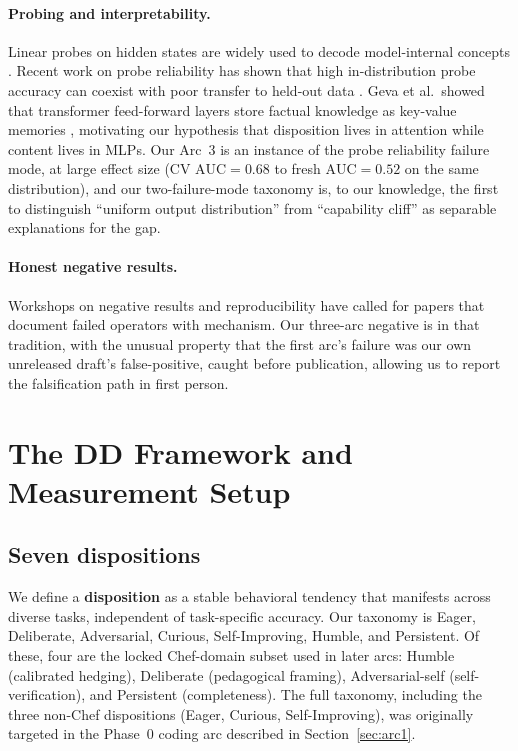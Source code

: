 \documentclass[11pt,a4paper]{article}
\begin{document}
\paragraph{Probing and interpretability.} Linear probes on hidden states are widely used to decode model-internal concepts \cite{belinkov2022probing}. Recent work on probe reliability has shown that high in-distribution probe accuracy can coexist with poor transfer to held-out data \cite{hewitt2019designing}. Geva et al.\ showed that transformer feed-forward layers store factual knowledge as key-value memories \cite{geva2021transformers}, motivating our hypothesis that disposition lives in attention while content lives in MLPs. Our Arc~3 is an instance of the probe reliability failure mode, at large effect size (CV $\text{AUC}{=}0.68$ to fresh $\text{AUC}{=}0.52$ on the same distribution), and our two-failure-mode taxonomy is, to our knowledge, the first to distinguish ``uniform output distribution'' from ``capability cliff'' as separable explanations for the gap.

\paragraph{Honest negative results.} Workshops on negative results and reproducibility have called for papers that document failed operators with mechanism. Our three-arc negative is in that tradition, with the unusual property that the first arc's failure was our own unreleased draft's false-positive, caught before publication, allowing us to report the falsification path in first person.

\section{The DD Framework and Measurement Setup}

\subsection{Seven dispositions}

We define a \textbf{disposition} as a stable behavioral tendency that manifests across diverse tasks, independent of task-specific accuracy. Our taxonomy is Eager, Deliberate, Adversarial, Curious, Self-Improving, Humble, and Persistent. Of these, four are the locked Chef-domain subset used in later arcs: Humble (calibrated hedging), Deliberate (pedagogical framing), Adversarial-self (self-verification), and Persistent (completeness). The full taxonomy, including the three non-Chef dispositions (Eager, Curious, Self-Improving), was originally targeted in the Phase~0 coding arc described in Section~\ref{sec:arc1}.
\end{document}
